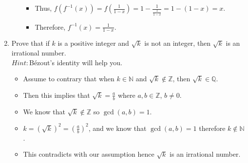 \documentclass[letterpaper,12pt]{article}
\begin{document}
\begin{enumerate}
\begin{itemize}
\begin{itemize}
	\item Thus, $f(f^{-1}(x)) = f(\frac{1}{1-x}) = 1-\frac{1}{\frac{1}{1-x}} = 1-(1-x) = x$.
	\item Therefore, $f^{-1}(x) = \frac{1}{1-x}$.
	\end{itemize}
\end{itemize}
\item Prove that if $k$ is a positive integer and $\sqrt{k}$ is not an integer, then $\sqrt{k}$ is an irrational number. \\ $Hint:$B\'ezout's identity will help you.
\begin{itemize}
	\item Assume to contrary that when $k \in \mathbb{N}$ and $\sqrt{k} \notin \mathbb{Z}$, then $\sqrt{k} \in \mathbb{Q}$.
	\item Then this implies that $\sqrt{k} = \frac{a}{b}$ where $a,b \in \mathbb{Z}$, $b \neq 0$.
	\item We know that $\sqrt{k} \notin \mathbb{Z}$ so $\gcd(a,b)= 1$.
	\item $k = (\sqrt{k})^2=(\frac{a}{b})^2$, and we know that $\gcd(a,b)=1$ therefore $ k\notin \mathbb{N}$.
	\item This contradicts with our assumption hence $\sqrt{k}$ is an irrational number.
\end{itemize}
\end{enumerate}



\end{document}
